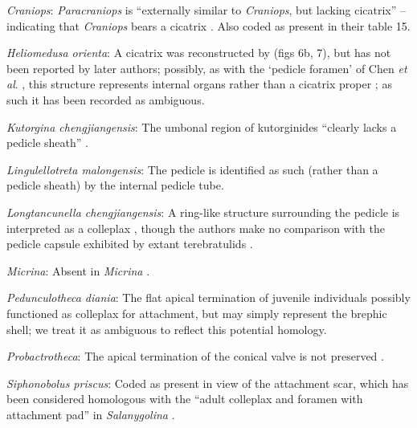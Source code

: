 \documentclass[openany]{book}
\theoremstyle{definition}
\theoremstyle{definition}
\theoremstyle{definition}
\theoremstyle{remark}
\begin{document}
\hypertarget{Craniops-coding-116}{}
\emph{Craniops}: \emph{Paracraniops} is ``externally similar to
\emph{Craniops}, but lacking cicatrix'' -- indicating that
\emph{Craniops} bears a cicatrix
\citep{Williams2000LinguliformeaCraniiformea}. Also coded as present in
their table 15.

\hypertarget{Heliomedusa_orienta-coding-116}{}
\emph{Heliomedusa orienta}: A cicatrix was reconstructed by
\citet{Jin1992Revisionof} (figs 6b, 7), but has not been reported by
later authors; possibly, as with the `pedicle foramen' of Chen \emph{et
al}. \citeyearpar{Chen2007Reinterpretationof}, this structure represents
internal organs rather than a cicatrix proper
\citep{Zhang2009Architectureand}; as such it has been recorded as
ambiguous.

\hypertarget{Kutorgina_chengjiangensis-coding-116}{}
\emph{Kutorgina chengjiangensis}: The umbonal region of kutorginides
``clearly lacks a pedicle sheath'' \citep{Holmer2018Theattachment}.

\hypertarget{Lingulellotreta_malongensis-coding-116}{}
\emph{Lingulellotreta malongensis}: The pedicle is identified as such
(rather than a pedicle sheath) by the internal pedicle tube.

\hypertarget{Longtancunella_chengjiangensis-coding-116}{}
\emph{Longtancunella chengjiangensis}: A ring-like structure surrounding
the pedicle is interpreted as a colleplax
\citep{Zhang2011Theexceptionally}, though the authors make no comparison
with the pedicle capsule exhibited by extant terebratulids
\citep[see][]{Holmer2018Evolutionarysignificance}.

\hypertarget{Micrina-coding-116}{}
\emph{Micrina}: Absent in \emph{Micrina} \citep{Holmer2011Firstrecord}.

\hypertarget{Pedunculotheca_diania-coding-116}{}
\emph{Pedunculotheca diania}: The flat apical termination of juvenile
individuals possibly functioned as colleplax for attachment, but may
simply represent the brephic shell; we treat it as ambiguous to reflect
this potential homology.

\hypertarget{Probactrotheca-coding-116}{}
\emph{Probactrotheca}: The apical termination of the conical valve is
not preserved \citep{Valent2012}.

\hypertarget{Siphonobolus_priscus-coding-116}{}
\emph{Siphonobolus priscus}: Coded as present in view of the attachment
scar, which has been considered homologous with the ``adult colleplax
and foramen with attachment pad'' in \emph{Salanygolina}
\citep{Popov2009Earlyontogeny}.
\end{document}

